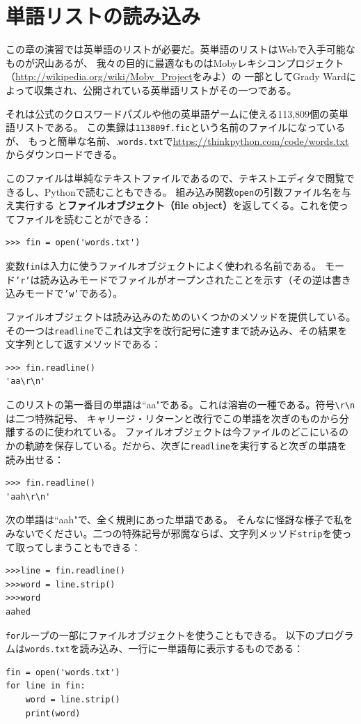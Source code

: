 \documentclass[a4j,12pt,makeidx]{jbook}
\begin{document}
\section{単語リストの読み込み}
この章の演習では英単語のリストが必要だ。英単語のリストはWebで入手可能なものが沢山あるが、
我々の目的に最適なものはMobyレキシコンプロジェクト（\url{http://wikipedia.org/wiki/Moby_Project}をみよ）の
一部としてGrady Wardによって収集され、公開されている英単語リストがその一つである。\par
それは公式のクロスワードパズルや他の英単語ゲームに使える113,809個の英単語リストである。
この集録は{\tt 113809f.fic}という名前のファイルになっているが、
もっと簡単な名前、.{\tt words.txt}で\url{https://thinkpython.com/code/words.txt}からダウンロードできる。 \par
このファイルは単純なテキストファイルであるので、テキストエディタで閲覧できるし、Pythonで読むこともできる。
組み込み関数{\tt open}の引数ファイル名を与え実行する
と{\bf ファイルオブジェクト（file object）}を返してくる。これを使ってファイルを読むことができる：
\begin{verbatim}
>>> fin = open('words.txt')
\end{verbatim}
変数{\tt fin}は入力に使うファイルオブジェクトによく使われる名前である。
モード{\tt 'r'}は読み込みモードでファイルがオープンされたことを示す（その逆は書き込みモードで{\tt 'w'}である）。\par
ファイルオブジェクトは読み込みのためのいくつかのメソッドを提供している。
その一つは{\tt readline}でこれは文字を改行記号に達すまで読み込み、その結果を文字列として返すメソッドである：
\begin{verbatim}
>>> fin.readline()
'aa\r\n'
\end{verbatim}
このリストの第一番目の単語は``aa"である。これは溶岩の一種である。符号{\verb"\r\n"}は二つ特殊記号、
キャリージ・リターンと改行でこの単語を次ぎのものから分離するのに使われている。
ファイルオブジェクトは今ファイルのどこにいるのかの軌跡を保存している。だから、次ぎに{\tt readline}を実行すると次ぎの単語を読み出せる：
\begin{verbatim}
>>> fin.readline()
'aah\r\n'
\end{verbatim}
次の単語は``aah"で、全く規則にあった単語である。
そんなに怪訝な様子で私をみないでください。二つの特殊記号が邪魔ならば、文字列メッソド{\tt strip}を使って取ってしまうこともできる：
\begin{verbatim}
>>>line = fin.readline()
>>>word = line.strip()
>>>word
aahed
\end{verbatim} \par
{\tt for}ループの一部にファイルオブジェクトを使うこともできる。
以下のプログラムは{\tt words.txt}を読み込み、一行に一単語毎に表示するものである：
\begin{verbatim}
fin = open('words.txt')
for line in fin:
    word = line.strip()
    print(word)
\end{verbatim}
\end{document}
